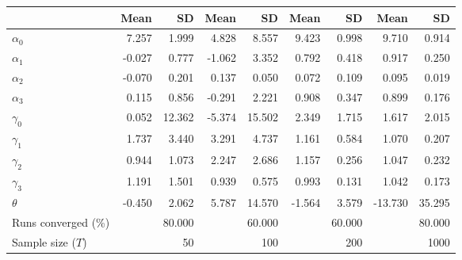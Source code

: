 
\begin{tabular}[t]{lrrrrrrrr}
\toprule
  & Mean & SD & Mean  & SD  & Mean   & SD   & Mean    & SD   \\
\midrule
$\alpha_{0}$ & 7.257 & 1.999 & 4.828 & 8.557 & 9.423 & 0.998 & 9.710 & 0.914\\
$\alpha_{1}$ & -0.027 & 0.777 & -1.062 & 3.352 & 0.792 & 0.418 & 0.917 & 0.250\\
$\alpha_{2}$ & -0.070 & 0.201 & 0.137 & 0.050 & 0.072 & 0.109 & 0.095 & 0.019\\
$\alpha_{3}$ & 0.115 & 0.856 & -0.291 & 2.221 & 0.908 & 0.347 & 0.899 & 0.176\\
$\gamma_{0}$ & 0.052 & 12.362 & -5.374 & 15.502 & 2.349 & 1.715 & 1.617 & 2.015\\
$\gamma_{1}$ & 1.737 & 3.440 & 3.291 & 4.737 & 1.161 & 0.584 & 1.070 & 0.207\\
$\gamma_{2}$ & 0.944 & 1.073 & 2.247 & 2.686 & 1.157 & 0.256 & 1.047 & 0.232\\
$\gamma_{3}$ & 1.191 & 1.501 & 0.939 & 0.575 & 0.993 & 0.131 & 1.042 & 0.173\\
$\theta$ & -0.450 & 2.062 & 5.787 & 14.570 & -1.564 & 3.579 & -13.730 & 35.295\\
Runs converged (\%) &  & 80.000 &  & 60.000 &  & 60.000 &  & 80.000\\
Sample size ($T$) &  & 50 &  & 100 &  & 200 &  & 1000\\
\bottomrule
\end{tabular}
